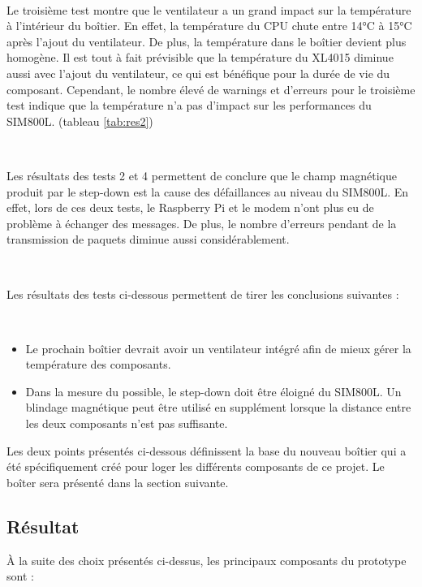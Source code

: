 ~

\noindent
Le troisième test montre que le ventilateur a un grand impact sur la température à l'intérieur du boîtier. En effet, la température du CPU chute entre 14°C à 15°C après l'ajout du ventilateur. De plus, la température dans le boîtier devient plus homogène. Il est tout à fait prévisible que la température du XL4015 diminue aussi avec l'ajout du ventilateur, ce qui est bénéfique pour la durée de vie du composant. Cependant, le nombre élevé de warnings et d'erreurs pour le troisième test indique que la température n'a pas d'impact sur les performances du SIM800L. (tableau \ref{tab:res2})

~

\noindent
Les résultats des tests 2 et 4 permettent de conclure que le champ magnétique produit par le step-down est la cause des défaillances au niveau du SIM800L. En effet, lors de ces deux tests, le Raspberry Pi et le modem n'ont plus eu de problème à échanger des messages. De plus, le nombre d'erreurs pendant de la transmission de paquets diminue aussi considérablement.

~

\noindent
Les résultats des tests ci-dessous permettent de tirer les conclusions suivantes :

~

\begin{itemize}
  \item Le prochain boîtier devrait avoir un ventilateur intégré afin de mieux gérer la température des composants.
  \item Dans la mesure du possible, le step-down doit être éloigné du SIM800L. Un blindage magnétique peut être utilisé en supplément lorsque la distance entre les deux composants n'est pas suffisante.
\end{itemize}

\noindent
Les deux points présentés ci-dessous définissent la base du nouveau boîtier qui a été spécifiquement créé pour loger les différents composants de ce projet. Le boîter sera présenté dans la section suivante.


\subsection{Résultat}
\label{sec:protores}

\noindent
À la suite des choix présentés ci-dessus, les principaux composants du prototype sont :

~

